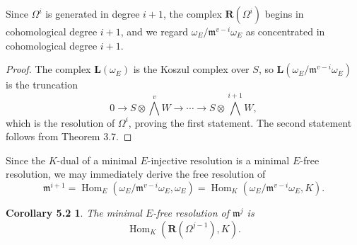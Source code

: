 \documentclass{tran-l}
\newcommand{\myHom}{\operatorname{Hom}}
\newcommand{\LL}{\mathbf{L}}
\newcommand{\RR}{\mathbf{R}}
\newcommand{\gm}{{\mathfrak{m}}}
\theoremstyle{plain}
\newtheorem*{theorem20}{Corollary 5.2}
\theoremstyle{remark}
\theoremstyle{definition}
\begin{document}
Since $\Omega ^{i}$ is generated in degree $i+1$,
the complex $\RR (\Omega ^{i})$
begins in cohomological degree $i+1$, and we regard
$\omega _{E}/\gm ^{v-i}\omega _{E}$ as concentrated in cohomological
degree $i+1$.

\begin{proof}  The complex $\LL (\omega _{E})$ is the Koszul complex
over $S$, so $\LL (\omega _{E}/\gm ^{v-i}\omega _{E})$ is the truncation
\begin{equation*}0\to S\otimes \textstyle{\bigwedge ^{v}}
W \to \cdots \to S\otimes 
\textstyle{\bigwedge ^{i+1}}W,
\end{equation*}
which is the resolution of $\Omega ^{i}$, proving the first statement.
The second statement follows from Theorem 3.7.\end{proof}


Since the $K$-dual of a minimal $E$-injective resolution is a
minimal $E$-free resolution, we may immediately derive the
free resolution of
\begin{equation*}\gm ^{i+1}=\myHom _{E}(\omega _{E}/\gm ^{v-i}\omega _{E}, \omega _{E})
=\myHom _{K}(\omega _{E}/\gm ^{v-i}\omega _{E}, K).
\end{equation*}
\begin{theorem20}
The minimal $E$-free resolution of $\gm ^{j}$ is
\begin{equation*}\myHom _{K}(\RR (\Omega ^{j-1}), K).
\end{equation*}
\end{theorem20}
\end{document}
